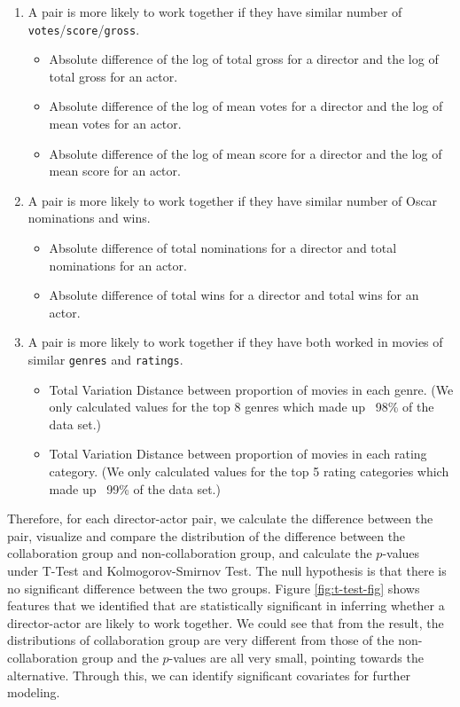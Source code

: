 \documentclass{article}
\begin{document}
\begin{enumerate}
\item  A pair is more likely to work together if they have similar number of \texttt{votes}/\texttt{score}/\texttt{gross}. 
\begin{itemize}
    \item Absolute difference of the log of total gross for a director and the log of total gross for an actor.
    \item Absolute difference of the log of mean votes for a director and the log of mean votes for an actor.
    \item Absolute difference of the log of mean score for a director and the log of mean score for an actor.
\end{itemize}

\item  A pair is more likely to work together if they have similar number of Oscar nominations and wins.
\begin{itemize}
    \item Absolute difference of total nominations for a director and total nominations for an actor.
    \item Absolute difference of total wins for a director and total wins for an actor.
\end{itemize}

\item  A pair is more likely to work together if they have both worked in movies of similar \texttt{genres} and \texttt{ratings}. 
 \begin{itemize}   
    \item Total Variation Distance between proportion of movies in each genre. (We only calculated values for the top 8 genres which made up ~98\% of the data set.)
    \item Total Variation Distance between proportion of movies in each rating category. (We only calculated values for the top 5 rating categories which made up ~99\% of the data set.)
\end{itemize}
\end{enumerate}

Therefore, for each director-actor pair, we calculate the difference between the pair, visualize and compare the distribution of the difference between the collaboration group and non-collaboration group, and calculate the $p$-values under T-Test and Kolmogorov-Smirnov Test. The null hypothesis is that there is no significant difference between the two groups. Figure \ref{fig:t-test-fig} shows features that we identified that are statistically significant in inferring whether a director-actor are likely to work together. We could see that from the result, the distributions of collaboration group are very different from those of the non-collaboration group and the $p$-values are all very small, pointing towards the alternative. Through this, we can identify significant covariates for further modeling. 
\end{document}
